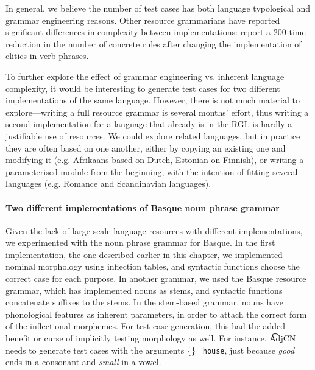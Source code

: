 In general, we believe the number of test cases has both language
typological and grammar engineering reasons. Other resource
grammarians have reported significant differences in complexity
between implementations: \citet{enache2010} report a
200-time reduction in the number of concrete rules after changing the
implementation of clitics in verb phrases.

To further explore the effect of grammar engineering vs. inherent
language complexity, it would be interesting to generate test cases
for two different implementations of the same language.  However,
there is not much material to explore---writing a full resource
grammar is several months' effort, thus writing a second
implementation for a language that already is in the RGL is hardly a
justifiable use of resources. We could explore related languages, but in
practice they are often based on one another, either by copying an
existing one and modifying it (e.g. Afrikaans based on Dutch, Estonian
on Finnish), or writing a parameterised module from the beginning,
with the intention of fitting several languages (e.g. Romance and
Scandinavian languages). 


\paragraph{Two different implementations of Basque noun phrase grammar}

Given the lack of large-scale language resources with different
implementations, we experimented with the noun phrase grammar for
Basque. In the first implementation, the one described earlier in this
chapter, we implemented nominal morphology using inflection tables,
and syntactic functions choose the correct case for each purpose. In
another grammar, we used the Basque resource grammar, which has
implemented nouns as stems, and syntactic functions concatenate
suffixes to the stems.  In the stem-based grammar, nouns have
phonological features as inherent parameters, in order to attach the
correct form of the inflectional morphemes. For test case generation,
this had the added benefit or curse of implicitly testing morphology
as well. For instance, \t{AdjCN} needs to generate test cases with the
arguments \{\} {\tt
  house}, just because \emph{good} ends in a consonant and
\emph{small} in a vowel. 

